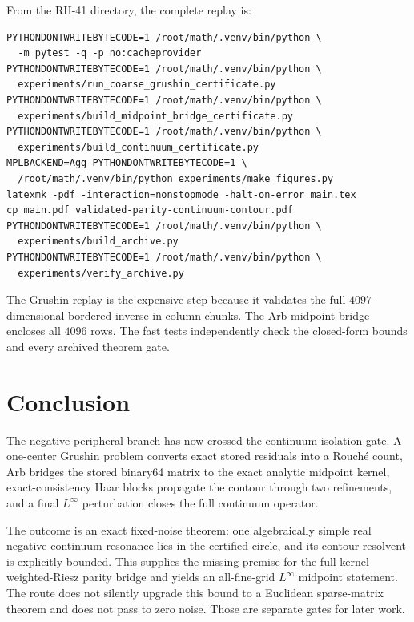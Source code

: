 \documentclass[11pt]{article}
\theoremstyle{definition}
\theoremstyle{remark}
\begin{document}
From the RH-41 directory, the complete replay is:
\begin{verbatim}
PYTHONDONTWRITEBYTECODE=1 /root/math/.venv/bin/python \
  -m pytest -q -p no:cacheprovider
PYTHONDONTWRITEBYTECODE=1 /root/math/.venv/bin/python \
  experiments/run_coarse_grushin_certificate.py
PYTHONDONTWRITEBYTECODE=1 /root/math/.venv/bin/python \
  experiments/build_midpoint_bridge_certificate.py
PYTHONDONTWRITEBYTECODE=1 /root/math/.venv/bin/python \
  experiments/build_continuum_certificate.py
MPLBACKEND=Agg PYTHONDONTWRITEBYTECODE=1 \
  /root/math/.venv/bin/python experiments/make_figures.py
latexmk -pdf -interaction=nonstopmode -halt-on-error main.tex
cp main.pdf validated-parity-continuum-contour.pdf
PYTHONDONTWRITEBYTECODE=1 /root/math/.venv/bin/python \
  experiments/build_archive.py
PYTHONDONTWRITEBYTECODE=1 /root/math/.venv/bin/python \
  experiments/verify_archive.py
\end{verbatim}

The Grushin replay is the expensive step because it validates the full
$4097$-dimensional bordered inverse in column chunks.  The Arb midpoint
bridge encloses all $4096$ rows.  The fast tests independently check the
closed-form bounds and every archived theorem gate.

\section{Conclusion}

The negative peripheral branch has now crossed the continuum-isolation
gate.  A one-center Grushin problem converts exact stored residuals into a
Rouch\'e count, Arb bridges the stored binary64 matrix to the exact analytic
midpoint kernel, exact-consistency Haar blocks propagate the contour through
two refinements, and a final $L^\infty$ perturbation closes the full
continuum operator.

The outcome is an exact fixed-noise theorem: one algebraically simple real
negative continuum resonance lies in the certified circle, and its contour
resolvent is explicitly bounded.  This supplies the missing premise for the
full-kernel weighted-Riesz parity bridge and yields an all-fine-grid
$L^\infty$ midpoint statement.  The route does not silently upgrade this
bound to a Euclidean sparse-matrix theorem and does not pass to zero noise.
Those are separate gates for later work.


\small

\end{document}
